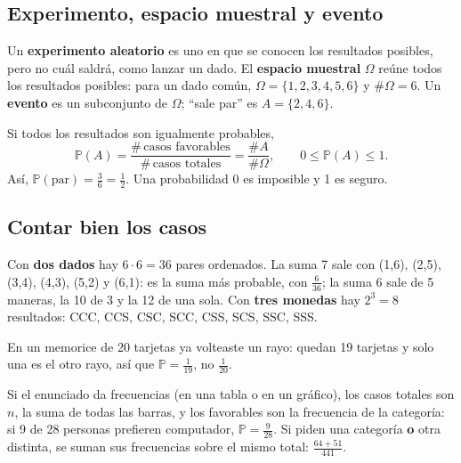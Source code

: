 \subsection{Experimento, espacio muestral y evento}
Un \textbf{experimento aleatorio} es uno en que se conocen los resultados posibles, pero no cuál saldrá, como lanzar un dado. El \textbf{espacio muestral} $\Omega$ reúne todos los resultados posibles: para un dado común, $\Omega = \{1,2,3,4,5,6\}$ y $\#\Omega = 6$. Un \textbf{evento} es un subconjunto de $\Omega$; ``sale par'' es $A = \{2,4,6\}$.
\begin{clave} Si todos los resultados son igualmente probables,
\[ \mathbb{P}(A) = \frac{\#\,\text{casos favorables}}{\#\,\text{casos totales}} = \frac{\#A}{\#\Omega}, \qquad 0 \le \mathbb{P}(A) \le 1. \]
Así, $\mathbb{P}(\text{par}) = \frac36 = \frac12$. Una probabilidad 0 es imposible y 1 es seguro.\end{clave}

\subsection{Contar bien los casos}
Con \textbf{dos dados} hay $6\cdot 6 = 36$ pares ordenados. La suma 7 sale con (1,6), (2,5), (3,4), (4,3), (5,2) y (6,1): es la suma más probable, con $\frac{6}{36}$; la suma 6 sale de 5 maneras, la 10 de 3 y la 12 de una sola. Con \textbf{tres monedas} hay $2^3 = 8$ resultados: CCC, CCS, CSC, SCC, CSS, SCS, SSC, SSS.
\begin{ojo} En un memorice de 20 tarjetas ya volteaste un rayo: quedan 19 tarjetas y solo una es el otro rayo, así que $\mathbb{P} = \frac{1}{19}$, no $\frac{1}{20}$.\end{ojo}
Si el enunciado da frecuencias (en una tabla o en un gráfico), los casos totales son $n$, la suma de todas las barras, y los favorables son la frecuencia de la categoría: si 9 de 28 personas prefieren computador, $\mathbb{P} = \frac{9}{28}$. Si piden una categoría \textbf{o} otra distinta, se suman sus frecuencias sobre el mismo total: $\frac{64 + 51}{441}$.

